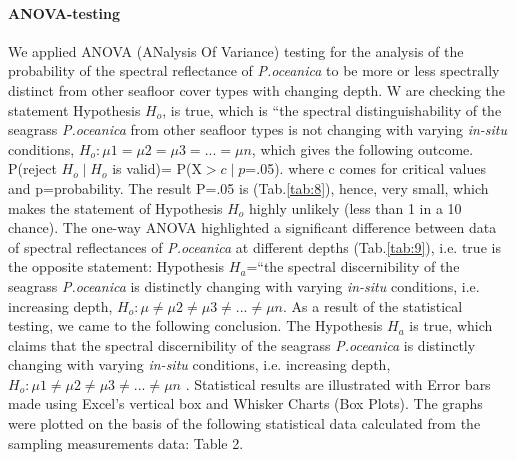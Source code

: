 \documentclass[11pt]{article}
\begin{document}
\paragraph{ANOVA-testing}
We applied \ac{ANOVA} (ANalysis Of Variance) testing for the analysis of the probability of the
spectral reflectance of \textit{P.oceanica} to be more or less spectrally distinct from other seafloor cover
types with changing depth. W are checking the statement Hypothesis $H_o$, is true, which is “the
spectral distinguishability of the seagrass \textit{P.oceanica} from other seafloor types is not changing with
varying \textit{in-situ} conditions, $H_o: \mu1 =\mu2 =\mu3=...= \mu n$, which gives the following outcome.
P(reject $H_o\mid H_o$ is valid)= P(X$>c\mid p$=.05).
where c comes for critical values and p=probability.
The result P=.05 is (Tab.\ref{tab:8}), hence, very small, which makes the statement of Hypothesis $H_o$ highly unlikely
(less than 1 in a 10 chance). The one-way \ac{ANOVA} highlighted a significant difference between data
of spectral reflectances of \textit{P.oceanica} at different depths (Tab.\ref{tab:9}), i.e. true is the opposite statement:
Hypothesis $H_a$=“the spectral discernibility of the seagrass \textit{P.oceanica} is distinctly changing with
varying \textit{in-situ} conditions, i.e. increasing depth, $H_o: \mu\neq\mu2\neq\mu3\neq ... \neq\mu n$.
As a result of the statistical testing, we came to the following conclusion.
The Hypothesis $H_a$ is true, which claims that the spectral discernibility of the seagrass \textit{P.oceanica} is
distinctly changing with varying \textit{in-situ} conditions, i.e. increasing depth, $H_o: \mu1\neq\mu2\neq\mu3\neq...\neq\mu n$ .
Statistical results are illustrated with Error bars made using Excel's vertical box and Whisker Charts
(Box Plots).
The graphs were plotted on the basis of the following statistical data calculated from the sampling
measurements data: Table 2.
\end{document}
